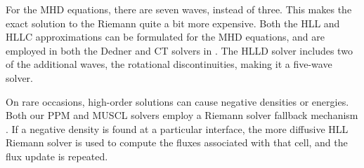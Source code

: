 For the MHD equations, there are seven waves, instead of three.  This makes the
exact solution to the Riemann quite a bit more expensive.  Both the HLL and HLLC
approximations can be formulated for the MHD equations, and are employed in both
the Dedner and CT solvers in \enzo.  The HLLD
solver includes two of the additional waves, the rotational discontinuities,
making it a five-wave solver.

On rare occasions, high-order solutions can cause negative densities or energies.  
Both our PPM and MUSCL solvers employ a Riemann
solver fallback mechanism \citep{Lemaster09}.  If a negative density is found at
a particular interface, the more diffusive HLL Riemann solver is used to compute the fluxes associated with that cell, and the flux update is repeated.



